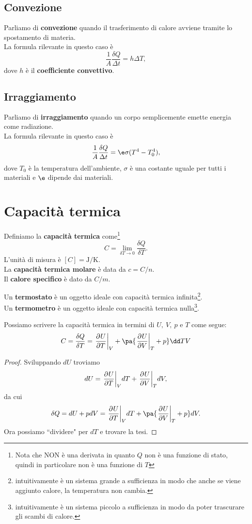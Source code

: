 \subsection{Convezione}
Parliamo di \textbf{convezione} quando il trasferimento di calore avviene tramite lo spostamento di materia.\\ La formula rilevante in questo caso \`e
\[\frac1A\frac{\delta Q}{\Delta t}=h\Delta T,\]
dove $h$ \`e il \textbf{coefficiente convettivo}.

\subsection{Irraggiamento}
Parliamo di \textbf{irraggiamento} quando un corpo semplicemente emette energia come radiazione.\\ 
La formula rilevante in questo caso \`e
\[\frac1A\frac{\delta Q}{\Delta t}=\e \sigma(T^4-T_0^4),\]
dove $T_0$ \`e la temperatura dell'ambiente, $\sigma$ \`e una costante uguale per tutti i materiali e $\e$ dipende dai materiali.

\section{Capacit\`a termica}
\begin{definition}
Definiamo la \textbf{capacit\`a termica} come\footnote{Nota che NON \`e una derivata in quanto $Q$ non \`e una funzione di stato, quindi in particolare non \`e una funzione di $T$}
\[C=\lim_{\delta T\to 0}\frac{\delta Q}{\delta T}.\]
L'unit\`a di misura \`e $[C]=\mathrm{J}/\mathrm{K}$.\\
La \textbf{capacit\`a termica molare} \`e data da $c=C/n$.\\
Il \textbf{calore specifico} \`e dato da $C/m$.
\end{definition}

\begin{definition}
Un \textbf{termostato} \`e un oggetto ideale con capacit\`a termica infinita\footnote{intuitivamente \`e un sistema grande a sufficienza in modo che anche se viene aggiunto calore, la temperatura non cambia.}.\\ 
Un \textbf{termometro} \`e un oggetto ideale con capacit\`a termica nulla\footnote{intuitivamente \`e un sistema piccolo a sufficienza in modo da poter trascurare gli scambi di calore.}.
\end{definition}

\begin{remark}
Possiamo scrivere la capacit\`a termica in termini di $U,\ V,\ p$ e $T$ come segue:
\[C=\frac{\delta Q}{\delta T}=\ppb TUV+\pa{\ppb VUT+p}\dd TV\]
\end{remark}
\begin{proof}
Sviluppando $dU$ troviamo
\[dU=\ppb TUVdT+\ppb VUTdV,\]
da cui
\[\delta Q=dU+pdV=\ppb TUVdT+\pa{\ppb VUT+p}dV.\]
Ora possiamo ``dividere" per $dT$ e trovare la tesi.
\end{proof}

